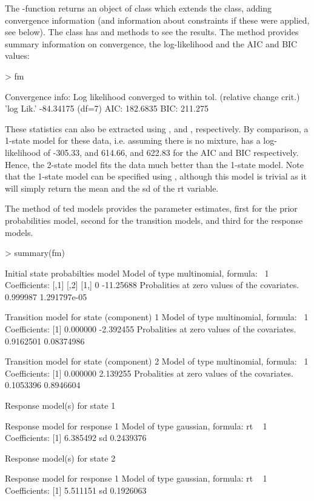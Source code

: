 \documentclass[article]{jss}
\begin{document}
The -function returns an object of class
 which extends the  class, adding
convergence information (and information about constraints if these
were applied, see below).  The class has  and
 methods to see the results.  The  method
provides summary information on convergence, the log-likelihood and
the AIC and BIC values:
\begin{Schunk}
\begin{Sinput}
> fm
\end{Sinput}
\begin{Soutput}
Convergence info: Log likelihood converged to within tol. (relative change crit.) 
'log Lik.' -84.34175 (df=7)
AIC:  182.6835 
BIC:  211.275 
\end{Soutput}
\end{Schunk}

These statistics can also be extracted using , 
and , respectively.  By comparison, a 1-state model for
these data, i.e. assuming there is no mixture, has a log-likelihood of
-305.33, and 614.66, and 622.83 for the AIC and BIC respectively.
Hence, the 2-state model fits the data much better than the 1-state
model.  Note that the 1-state model can be specified using , although this model is trivial
as it will simply return the mean and the sd of the rt variable.

The  method of ted models provides the
parameter estimates, first for the prior probabilities model, second
for the transition models, and third for the response models.
\begin{Schunk}
\begin{Sinput}
> summary(fm)
\end{Sinput}
\begin{Soutput}
Initial state probabilties model 
Model of type multinomial, formula: ~1
Coefficients: 
     [,1]      [,2]
[1,]    0 -11.25688
Probalities at zero values of the covariates.
0.999987 1.291797e-05 

Transition model for state (component) 1 
Model of type multinomial, formula: ~1
Coefficients: 
[1]  0.000000 -2.392455
Probalities at zero values of the covariates.
0.9162501 0.08374986 

Transition model for state (component) 2 
Model of type multinomial, formula: ~1
Coefficients: 
[1] 0.000000 2.139255
Probalities at zero values of the covariates.
0.1053396 0.8946604 


Response model(s) for state 1 

Response model for response 1 
Model of type gaussian, formula: rt ~ 1
Coefficients: 
[1] 6.385492
sd  0.2439376 


Response model(s) for state 2 

Response model for response 1 
Model of type gaussian, formula: rt ~ 1
Coefficients: 
[1] 5.511151
sd  0.1926063 
\end{Soutput}
\end{Schunk}
\end{document}
